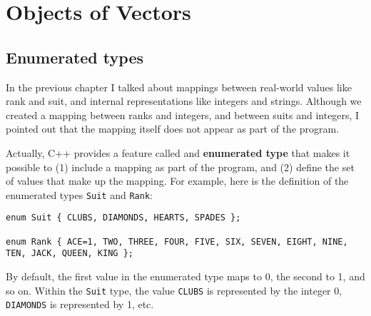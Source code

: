 





\chapter{Objects of Vectors}

\section{Enumerated types}

In the previous chapter I talked about mappings between
real-world values like rank and suit, and internal representations
like integers and strings.  Although we created a mapping between
ranks and integers, and between suits and integers, I pointed
out that the mapping itself does not appear as part of the
program.

Actually, C++ provides a feature called and {\bf enumerated type}
that makes it possible to (1) include a mapping as part of the
program, and (2) define the set of values that make up the
mapping.  For example, here is the definition
of the enumerated types {\tt Suit} and {\tt Rank}:

\begin{lstlisting}
enum Suit { CLUBS, DIAMONDS, HEARTS, SPADES };

enum Rank { ACE=1, TWO, THREE, FOUR, FIVE, SIX, SEVEN, EIGHT, NINE,
TEN, JACK, QUEEN, KING };
\end{lstlisting}
%
By default, the first value in the enumerated type maps to
0, the second to 1, and so on.  Within the {\tt Suit} type, the value
{\tt CLUBS} is represented by the integer 0, {\tt DIAMONDS} is
represented by 1, etc.

